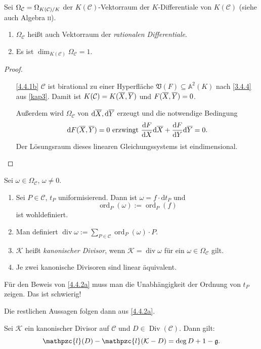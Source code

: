 \documentclass[a4paper,12pt,index=toc]{scrbook}
\theoremstyle{keinenummern} %
\def\CC{\mathcal{C}}
\def\A{\mathbb{A}}
\def\V{\mathfrak{V}}
\renewcommand{\d}{\mathrm{d}}
\newcommand{\K}{\mathcal{K}}
\newcommand{\g}{\mathfrak{g}}
\def\ll{\mathpzc{l}}
\newcommand{\Div}{\operatorname{Div}}
\renewcommand{\div}{\operatorname{div}}
\newcommand{\ord}{\operatorname{ord}}
\def\Bar#1{\ensuremath\overline{#1}}
\begin{document}
\begin{db}\label{4.4.1} Sei $\Omega_{\CC}=\Omega_{\Quotient{K(\CC)}{K}}$ der $K(\CC)$-Vektorraum der $K$-Differentiale von $K(\CC)$ (siehe auch Algebra {\scshape ii}).
\begin{enumerate}
 \item{} $\Omega_{\CC}$ heißt auch Vektorraum der \emph{rationalen Differentiale}.
 \item{} Es ist $\dim_{K(\CC)} \Omega_{\CC}=1$.
\end{enumerate}
\end{db}
\begin{proof} \begin{enumerate}
\item[\ref{4.4.1b}] $\CC$ ist birational zu einer Hyperfläche $\V(F)\subseteq \A^2(K)$ nach \cref{3.4.4} aus \cref{kap3}. Damit ist $K(\CC)=K(\Bar{X},\Bar{Y})$ und $F(\Bar{X},\Bar{Y})=0$. 

Außerdem wird $\Omega_{\CC}$ von $\d\Bar{X}, \d\Bar{Y}$ erzeugt und die notwendige Bedingung 
\begin{equation*}\d F(\Bar{X},\Bar{Y})=0\text{ erzwingt }\frac{\d F}{\d X} \d \Bar{X}+\frac{\d F}{\d Y} \d \Bar{Y}=0.\end{equation*}
Der Lösungsraum dieses linearen Gleichungssystems ist eindimensional. \end{enumerate}
\end{proof}
\begin{db}\label{4.4.2}  Sei $\omega \in \Omega_{\CC}$, $\omega\neq 0$. 
  \begin{enumerate}
  \item{} Sei $P\in \CC$, $t_P$ uniformisierend. Dann ist $\omega=f\cdot\d t_P$ und \begin{equation*}\ord_P (\omega):=\ord_P (f)\end{equation*} ist wohldefiniert.
  \item Man definiert $\div \omega:= \sum\limits_{P\in \CC}^{} \ord_P (\omega) \cdot P$.
  \item $\K$ heißt \emph{kanonischer Divisor}, wenn $\K=\div \omega$ für ein $\omega\in \Omega_{\CC}$ gilt.
  \item Je zwei kanonische Divisoren sind linear äquivalent.
  \end{enumerate}
\end{db}
\begin{w} Für den Beweis von \ref{4.4.2a} muss man die Unabhängigkeit der Ordnung von $t_P$ zeigen. Das ist schwierig!

Die restlichen Aussagen folgen dann aus \ref{4.4.2a}.
\end{w}
\begin{satz}
Sei $\K$ ein kanonischer Divisor auf $\CC$ und $D\in \Div(\CC)$. Dann gilt: \begin{equation*}\ll(D)-\ll(\K - D)=\deg D+1-\g.\end{equation*}
\end{satz}
\end{document}
